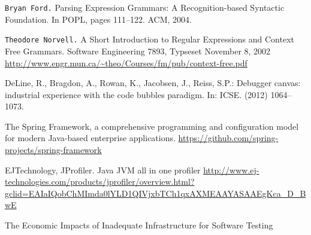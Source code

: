 \begin{thebibliography}{9}
 \texttt{Bryan Ford.} Parsing Expression Grammars: A Recognition-based Syntactic Foundation. In POPL, pages 111–122. ACM, 2004.

 \texttt{Theodore Norvell.} A Short Introduction to Regular Expressions and Context Free Grammars. Software Engineering 7893, Typseset November 8, 2002
	\url{http://www.engr.mun.ca/~theo/Courses/fm/pub/context-free.pdf}

\bibitem{}DeLine, R., Bragdon, A., Rowan, K., Jacobsen, J., Reiss, S.P.: Debugger canvas: industrial experience with the code bubbles paradigm. In: ICSE. (2012) 1064–1073.

 The Spring Framework, a comprehensive programming and configuration model for modern Java-based enterprise applications.
\url{https://github.com/spring-projects/spring-framework}

 EJTechnology, JProfiler. Java JVM all in one profiler
	\url{http://www.ej-technologies.com/products/jprofiler/overview.html?gclid=EAIaIQobChMImda0lYLD1QIVjxbTCh1qxAXMEAAYASAAEgKca_D_BwE}

 The Economic Impacts of Inadequate Infrastructure for Software Testing
\end{thebibliography}